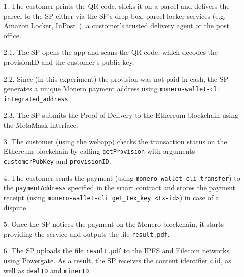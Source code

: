 \documentclass[pdftex,twocolumn,epjc3]{svjour3}
\begin{document}
{\begin{enumerate}
  \item[1.] The customer prints the QR code, sticks it on a parcel and delivers the parcel to the SP either via the SP's drop box, parcel locker services (e.g. Amazon Locker, InPost~\cite{inpostParcelLockerService}), a customer's trusted delivery agent or the post office.

  \item[2.1.] The SP opens the app and scans the QR code, which decodes the provisionID and the customer's public key.

  \item[2.2.] Since (in this experiment) the provision was not paid in cash, the SP generates a unique Monero payment address using \texttt{monero-wallet-cli integrated\_address}. 
  \item[2.3.] The SP submits the Proof of Delivery to the Ethereum blockchain using the MetaMask interface. 

  \item[3.] The customer (using the webapp) checks the transaction status on the Ethereum blockchain by calling \texttt{getProvision} with arguments \texttt{customerPubKey} and \texttt{provisionID}.

  \item[4.] The customer sends the payment (using \texttt{monero-wallet-cli transfer}) to the \texttt{paymentAddress} specified in the smart contract and stores the payment receipt (using \texttt{monero-wallet-cli get\_tex\_key <tx-id>}) in case of a dispute.
  \item[5.] Once the SP notices the payment on the Monero blockchain, it starts providing the service and outputs the file \texttt{result.pdf}.

  \item[6.] The SP uploads the file \texttt{result.pdf} to the IPFS and Filecoin networks using Powergate. As a result, the SP receives the content identifier \texttt{cid}, as well as \texttt{dealID} and \texttt{minerID}.


\end{enumerate}}
\end{document}
